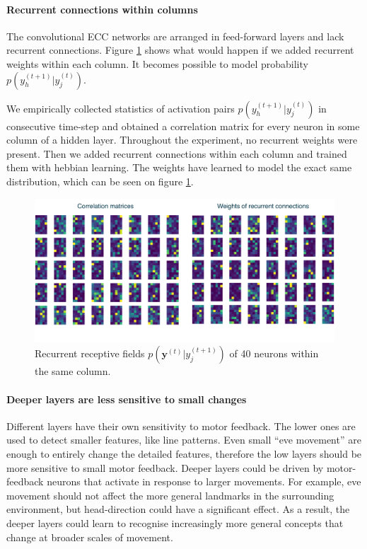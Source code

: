 \documentclass[12pt]{article}
\begin{document}
\paragraph{Recurrent connections within columns}
The convolutional ECC networks are arranged in feed-forward layers and lack recurrent connections. Figure \ref{fig:recurrent_connections} shows what would happen if we added recurrent weights within each column. It becomes possible to model probability $p(y_h^{(t+1)}|y_j^{(t)})$. 

We empirically collected statistics of activation pairs $p(y_h^{(t+1)}|y_j^{(t)})$ in consecutive time-step and obtained a correlation matrix for every neuron in some column of a hidden layer. Throughout the experiment, no recurrent weights were present. Then we added recurrent connections within each column and trained them with hebbian learning. The weights have learned to model the exact same distribution, which can be seen on figure \ref{fig:recurrent_connections}.

\begin{figure}[!htbp]
	\centering
	\includegraphics[width=13.8cm]{recurrent_connections}
	\caption{Recurrent receptive fields $p(\boldsymbol{y}^{(t)}|y_j^{(t+1)})$ of 40 neurons within the same column. }
	\label{fig:recurrent_connections}
\end{figure} 

\paragraph{Deeper layers are less sensitive to small changes} 
Different layers have their own sensitivity to motor feedback. The lower ones are used to detect smaller features, like line patterns. Even small ``eve movement'' are enough to entirely change the detailed features, therefore the low layers should be more sensitive to small motor feedback. Deeper layers could be driven by motor-feedback neurons that activate in response to larger movements. For example, eve movement should not affect the more general landmarks in the surrounding environment, but head-direction could have a significant effect. As a result, the deeper  layers could learn to recognise increasingly more general concepts that change at broader scales of movement. 
\end{document}
